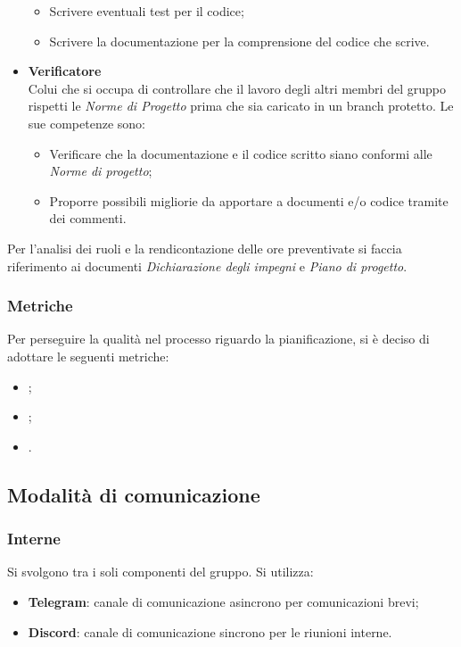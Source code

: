 \begin{itemize}
\begin{itemize}
              \item Scrivere eventuali test per il codice;
              \item Scrivere la documentazione per la comprensione del codice che scrive.
          \end{itemize}
    \item \textbf{Verificatore}\\
          Colui che si occupa di controllare che il lavoro degli altri membri del gruppo rispetti le \textit{Norme di Progetto}
          prima che sia caricato in un branch protetto.
          Le sue competenze sono:
          \begin{itemize}
              \item Verificare che la documentazione e il codice scritto siano conformi alle
                    \textit{Norme di progetto};
              \item Proporre possibili migliorie da apportare a documenti e/o codice tramite dei
                    commenti.
          \end{itemize}
\end{itemize}

Per l'analisi dei ruoli e la rendicontazione delle ore preventivate si faccia
riferimento ai documenti \textit{Dichiarazione degli impegni} e \textit{Piano
    di progetto}.

\subsubsection{Metriche}
Per perseguire la qualità nel processo riguardo la pianificazione, si è deciso
di adottare le seguenti metriche:
\begin{itemize}
    \item {};
    \item {};
    \item {}.
\end{itemize}

\subsection{Modalità di comunicazione}
\subsubsection{Interne}
Si svolgono tra i soli componenti del gruppo. Si utilizza:
\begin{itemize}
    \item \textbf{Telegram}: canale di comunicazione asincrono per comunicazioni brevi;
    \item \textbf{Discord}: canale di comunicazione sincrono per le riunioni interne.
\end{itemize}
